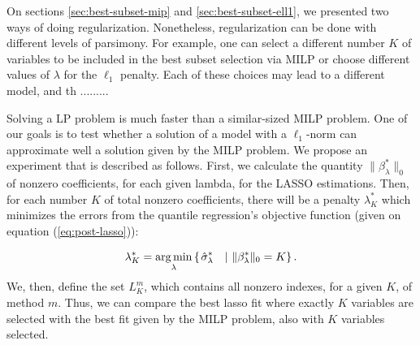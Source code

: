 On sections \ref{sec:best-subset-mip} and \ref{sec:best-subset-ell1}, we presented two ways of doing regularization. Nonetheless, regularization can be done with different levels of parsimony. For example, one can select a different number $K$ of variables to be included in the best subset selection via MILP or choose different values of $\lambda$ for the $\ell_1$ penalty. Each of these choices may lead to a different model, and th ......... 


Solving a LP problem is much faster than a similar-sized MILP problem. One of our goals is to test whether a solution of a model with a $\ell_1$-norm can approximate well a solution given by the MILP problem. We propose an experiment that is described as follows. First, we calculate the quantity $\| \beta^*_\lambda \|_0$ of nonzero coefficients, for each given lambda, for the LASSO estimations.
Then, for each number $K$ of total nonzero coefficients, there will be a penalty $\lambda^*_K$ which minimizes the errors from the quantile regression's objective function (given on equation (\ref{eq:post-lasso})): 

\begin{equation}
\lambda^*_K = \operatorname*{arg\,min}_\lambda \left\lbrace \left.  \hat{\sigma}_{\lambda}^{*} \quad  \right| \, \| \beta^*_\lambda \|_0 = K \right\rbrace.
\end{equation}
We, then, define the set $L_K^{m}$, which contains all nonzero indexes, for a given $K$, of method $m$.
Thus, we can compare the best lasso fit where exactly $K$ variables are selected with the best fit given by the MILP problem, also with $K$ variables selected.

